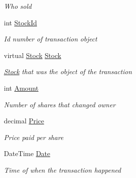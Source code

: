 \begin{DoxyCompactItemize}
\begin{DoxyCompactList}\small\item\em Who sold \end{DoxyCompactList}\item 
int \mbox{\hyperlink{class_gielda_l2_1_1_d_b_1_1_entities_1_1_transaction_a2f2b36047cdf38be85073df31d5557dd}{Stock\+Id}}
\begin{DoxyCompactList}\small\item\em Id number of transaction object \end{DoxyCompactList}\item 
virtual \mbox{\hyperlink{class_gielda_l2_1_1_d_b_1_1_entities_1_1_stock}{Stock}} \mbox{\hyperlink{class_gielda_l2_1_1_d_b_1_1_entities_1_1_transaction_a6cc9da6f7b5b6b95f74ee8943909e8e6}{Stock}}
\begin{DoxyCompactList}\small\item\em \mbox{\hyperlink{class_gielda_l2_1_1_d_b_1_1_entities_1_1_stock}{Stock}} that was the object of the transaction \end{DoxyCompactList}\item 
int \mbox{\hyperlink{class_gielda_l2_1_1_d_b_1_1_entities_1_1_transaction_adef61313fd5ec303b07c09944d52a23c}{Amount}}
\begin{DoxyCompactList}\small\item\em Number of shares that changed owner \end{DoxyCompactList}\item 
decimal \mbox{\hyperlink{class_gielda_l2_1_1_d_b_1_1_entities_1_1_transaction_a82970ccb62642534e62697b19f7afc52}{Price}}
\begin{DoxyCompactList}\small\item\em Price paid per share \end{DoxyCompactList}\item 
Date\+Time \mbox{\hyperlink{class_gielda_l2_1_1_d_b_1_1_entities_1_1_transaction_aee96cad220d9d20bad8c6d483a4910bc}{Date}}
\begin{DoxyCompactList}\small\item\em Time of when the transaction happened \end{DoxyCompactList}\end{DoxyCompactItemize}



